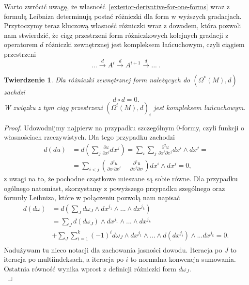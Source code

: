 \documentclass[licencjacka]{pracamgr}
\theoremstyle{definition}
\theoremstyle{definition}
\theoremstyle{plain}
\theoremstyle{plain}
\theoremstyle{plain}
\newtheorem{theorem}{Twierdzenie}[section]
\theoremstyle{plain}
\begin{document}
Warto zwrócić uwagę, że własność~\ref{exterior-derivative-for-one-forms} wraz z
formułą Leibniza determinują postać różniczki dla form w wyższych gradacjach. \\

Przytoczymy teraz kluczową własność różniczki wraz z dowodem, która pozwoli nam
stwierdzić, że ciąg przestrzeni form różniczkowych kolejnych gradacji z
operatorem $d$ różniczki zewnętrznej jest kompleksem łańcuchowym, czyli ciągiem
przestrzeni
\[
   ... \xrightarrow{d} 
A^i 
   \xrightarrow{d} 
A^{i+1}
   \xrightarrow{d} 
...~.
\]

\begin{theorem}
Dla różniczki zewnętrznej form należących do $\left(\Omega^\ast (M), d \right)$
zachdzi
\[
d \circ d = 0.
\]
W związku z tym ciąg przestrzeni  $\left(\Omega^i (M), d \right)_i$ jest
kompleksem łańcuchowym.
\end{theorem}

\begin{proof}
Udowodnijmy najpierw na przypadku szczególnym 0-formy, czyli funkcji o
własnościach rzeczywistych. Dla tego przypadku zachodzi
\begin{align*}
d(du) & = d \left( \sum_j \frac{\partial u} {\partial x^j} dx^j \right) =
\sum_i \sum_j \frac{\partial^2 u}{\partial x^i \partial x^j } dx^i \wedge dx^j =  \\
& = \sum_{i < j} \left(
\frac{\partial^2 u}{\partial x^i \partial x^j}  -
\frac{\partial^2 u}{\partial x^j \partial x^i} 
 \right) dx^i \wedge dx^j = 0,
\end{align*}
z uwagi na to, że pochodne cząstkowe mieszane są sobie równe. 
Dla przypadku ogólnego natomiast, skorzystamy z powyższego przypadku szególnego
oraz formuły Leibniza, które w połączeniu pozwolą nam napisać
\begin{align*}
d(d \omega) & = d \left( \sum_J d \omega_J \wedge dx^{j_1} \wedge ... \wedge dx^{j_k} \right) \\
             & = \sum_J d( d\omega_J) \wedge dx^{j_1} \wedge ... \wedge dx^{j_k}  \\
& + \sum_J \sum_{i=1}^k (-1)^i d \omega_J \wedge dx^{j_1} \wedge ... \wedge d(dx^{j_i}) \wedge ... dx^{j_k} = 0.  \\
\end{align*}
Nadużywam tu nieco notacji dla zachowania jasności dowodu. Iteracja po $J$ to iteracja
po multiindeksach, a iteracja po $i$ to normalna konwencja sumowania. Ostatnia
równość wynika wprost z definicji różniczki form $d \omega_J$. \\

\end{proof}
\end{document}
